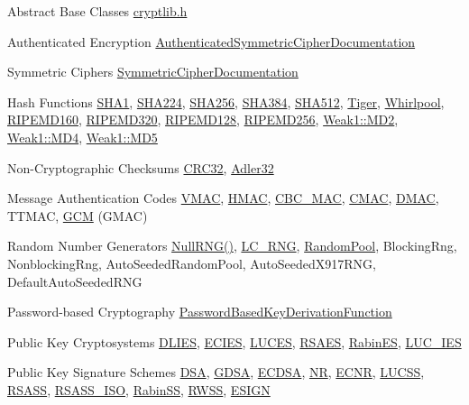 
\begin{DoxyDescription}
\item[Abstract Base Classes]\hyperlink{cryptlib_8h}{cryptlib.h} 
\item[Authenticated Encryption]\hyperlink{struct_authenticated_symmetric_cipher_documentation}{AuthenticatedSymmetricCipherDocumentation} 
\item[Symmetric Ciphers]\hyperlink{struct_symmetric_cipher_documentation}{SymmetricCipherDocumentation} 
\item[Hash Functions]\hyperlink{class_s_h_a1}{SHA1}, \hyperlink{class_s_h_a224}{SHA224}, \hyperlink{class_s_h_a256}{SHA256}, \hyperlink{class_s_h_a384}{SHA384}, \hyperlink{class_s_h_a512}{SHA512}, \hyperlink{class_tiger}{Tiger}, \hyperlink{class_whirlpool}{Whirlpool}, \hyperlink{class_r_i_p_e_m_d160}{RIPEMD160}, \hyperlink{class_r_i_p_e_m_d320}{RIPEMD320}, \hyperlink{class_r_i_p_e_m_d128}{RIPEMD128}, \hyperlink{class_r_i_p_e_m_d256}{RIPEMD256}, \hyperlink{class_weak1_1_1_m_d2}{Weak1::MD2}, \hyperlink{class_weak1_1_1_m_d4}{Weak1::MD4}, \hyperlink{class_weak1_1_1_m_d5}{Weak1::MD5} 
\item[Non-\/Cryptographic Checksums]\hyperlink{class_c_r_c32}{CRC32}, \hyperlink{class_adler32}{Adler32} 
\item[Message Authentication Codes]\hyperlink{class_v_m_a_c}{VMAC}, \hyperlink{class_h_m_a_c}{HMAC}, \hyperlink{class_c_b_c___m_a_c}{CBC\_\-MAC}, \hyperlink{class_c_m_a_c}{CMAC}, \hyperlink{class_d_m_a_c}{DMAC}, TTMAC, \hyperlink{struct_g_c_m}{GCM} (GMAC) 
\item[Random Number Generators]\hyperlink{cryptlib_8h_ad49988745c9451f8a80fb2a644849780}{NullRNG()}, \hyperlink{class_l_c___r_n_g}{LC\_\-RNG}, \hyperlink{class_random_pool}{RandomPool}, BlockingRng, NonblockingRng, AutoSeededRandomPool, AutoSeededX917RNG, DefaultAutoSeededRNG 
\item[Password-\/based Cryptography]\hyperlink{class_password_based_key_derivation_function}{PasswordBasedKeyDerivationFunction} 
\item[Public Key Cryptosystems]\hyperlink{struct_d_l_i_e_s}{DLIES}, \hyperlink{struct_e_c_i_e_s}{ECIES}, \hyperlink{struct_l_u_c_e_s}{LUCES}, \hyperlink{struct_r_s_a_e_s}{RSAES}, \hyperlink{struct_rabin_e_s}{RabinES}, \hyperlink{struct_l_u_c___i_e_s}{LUC\_\-IES} 
\item[Public Key Signature Schemes]\hyperlink{struct_d_s_a}{DSA}, \hyperlink{struct_g_d_s_a}{GDSA}, \hyperlink{struct_e_c_d_s_a}{ECDSA}, \hyperlink{struct_n_r}{NR}, \hyperlink{struct_e_c_n_r}{ECNR}, \hyperlink{struct_l_u_c_s_s}{LUCSS}, \hyperlink{struct_r_s_a_s_s}{RSASS}, \hyperlink{struct_r_s_a_s_s___i_s_o}{RSASS\_\-ISO}, \hyperlink{struct_rabin_s_s}{RabinSS}, \hyperlink{struct_r_w_s_s}{RWSS}, \hyperlink{struct_e_s_i_g_n}{ESIGN} 

\end{DoxyDescription}

